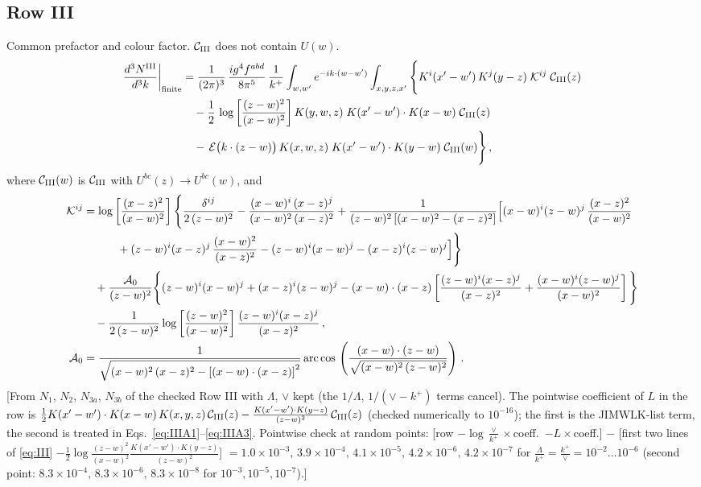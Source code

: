 \documentclass[9pt]{article}
\numberwithin{equation}{section}
\begin{document}
\subsection{Row III}
\noindent Common prefactor and colour factor. $\mathcal{C}_{\rm III}$ does not contain $U(w)$.
\begin{align}
\frac{d^{3}N^{\rm III}}{d^{3}k}\bigg|_{\rm finite} & =\frac{1}{(2\pi)^{3}}\,\frac{ig^{4}f^{abd}}{8\pi^{5}}\,\frac{1}{k^{+}}\int_{w,w'}e^{-ik\cdot(w-w')}\int_{x,y,z,x'}\Bigg\{
K^{i}(x'-w')\,K^{j}(y-z)\;\mathcal{K}^{ij}\;\mathcal{C}_{\rm III}(z)\notag\\
&\quad-\frac12\,\log\left[\frac{(z-w)^{2}}{(x-w)^{2}}\right]K(y,w,z)\;K(x'-w')\cdot K(x-w)\;\mathcal{C}_{\rm III}(z)\notag\\
&\quad-\,\mathcal{E}\big(k\cdot(z-w)\big)\,K(x,w,z)\;K(x'-w')\cdot K(y-w)\;\mathcal{C}_{\rm III}(w)\Bigg\}\,,\label{eq:III}
\end{align}
where $\mathcal{C}_{\rm III}(w)$ is $\mathcal{C}_{\rm III}$ with $U^{bc}(z)\to U^{bc}(w)$, and
\begin{align}
\mathcal{K}^{ij}&=\log\left[\frac{(x-z)^{2}}{(x-w)^{2}}\right]\Bigg\{\frac{\delta^{ij}}{2\,(z-w)^{2}}-\frac{(x-w)^{i}\,(x-z)^{j}}{(x-w)^{2}\,(x-z)^{2}}
+\frac{1}{(z-w)^{2}\left[(x-w)^{2}-(x-z)^{2}\right]}\Big[(x-w)^{i}(z-w)^{j}\,\frac{(x-z)^{2}}{(x-w)^{2}}\notag\\
&\qquad\quad+(z-w)^{i}(x-z)^{j}\,\frac{(x-w)^{2}}{(x-z)^{2}}-(z-w)^{i}(x-w)^{j}-(x-z)^{i}(z-w)^{j}\Big]\Bigg\}\notag\\
&\quad+\frac{\mathcal{A}_{0}}{(z-w)^{2}}\Bigg\{(z-w)^{i}(x-w)^{j}+(x-z)^{i}(z-w)^{j}-(x-w)\cdot(x-z)\left[\frac{(z-w)^{i}(x-z)^{j}}{(x-z)^{2}}+\frac{(x-w)^{i}(z-w)^{j}}{(x-w)^{2}}\right]\Bigg\}\notag\\
&\quad-\frac{1}{2\,(z-w)^{2}}\log\left[\frac{(z-w)^{2}}{(x-w)^{2}}\right]\frac{(z-w)^{i}(x-z)^{j}}{(x-z)^{2}}\,,\label{eq:Kij}\\
\mathcal{A}_{0} & = \frac{1}{\sqrt{(x-w)^{2}\,(x-z)^{2}-\left[(x-w)\cdot (x-z)\right]^{2}}}\,\mathrm{arc\,cos}\,\left(\frac{(x-w)\cdot (z-w)}{\sqrt{(x-w)^{2}\,(z-w)^{2}}}\right)\,.\notag
\end{align}
{\color{gray}\small [From $N_{1}$, $N_{2}$, $N_{3a}$, $N_{3b}$ of the checked Row III with $\Lambda$, $\vee$ kept (the $1/\Lambda$, $1/(\vee-k^{+})$ terms cancel). The pointwise coefficient of $L$ in the row is $\frac12K(x'-w')\cdot K(x-w)\,K(x,y,z)\,\mathcal{C}_{\rm III}(z)-\frac{K(x'-w')\cdot K(y-z)}{(z-w)^{2}}\,\mathcal{C}_{\rm III}(z)$ (checked numerically to $10^{-16}$); the first is the JIMWLK-list term, the second is treated in Eqs.~\eqref{eq:IIIA1}--\eqref{eq:IIIA3}. Pointwise check at random points: [row $-\log\frac{\vee}{k^{+}}\times$coeff.\ $-L\times$coeff.] $-$ [first two lines of \eqref{eq:III} $-\frac12\log\frac{(z-w)^{2}}{(x-w)^{2}}\frac{K(x'-w')\cdot K(y-z)}{(z-w)^{2}}$] $=1.0\times10^{-3},\,3.9\times10^{-4},\,4.1\times10^{-5},\,4.2\times10^{-6},\,4.2\times10^{-7}$ for $\frac{\Lambda}{k^{+}}=\frac{k^{+}}{\vee}=10^{-2}\dots10^{-6}$ (second point: $8.3\times10^{-4},\,8.3\times10^{-6},\,8.3\times10^{-8}$ for $10^{-3},10^{-5},10^{-7}$).]}
\end{document}
